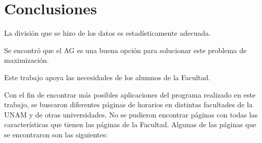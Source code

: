 \chapter{Conclusiones}

La división que se hizo de los datos es estadísticamente  adecuada.

Se encontró que el AG es una buena opción para solucionar este problema de maximización.

Este trabajo apoya las necesidades de los alumnos de la Facultad.

Con el fin de encontrar más posibles aplicaciones del programa realizado en este trabajo, se buscaron diferentes páginas de horarios en distintas facultades de la UNAM y de otras universidades. No se pudieron encontrar páginas con todas las características que tienen las páginas de la Facultad. Algunas de las páginas que se encontraron son las siguientes:


